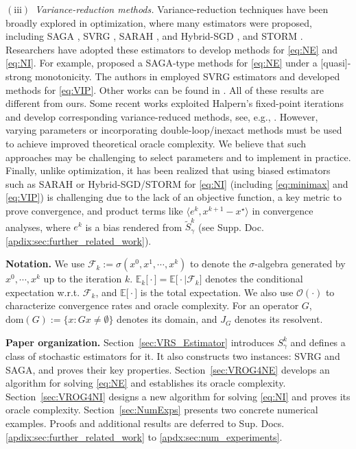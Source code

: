 \documentclass{article}
\newcommand{\sets}[1]{\{#1\}}
\newcommand{\iprods}[1]{\langle #1\rangle}
\newcommand{\dom}[1]{\mathrm{dom}(#1)}
\newcommand{\Expsk}[2]{\mathbb{E}_{#1}\big[#2\big]}
\newcommand{\Expk}[1]{\mathbb{E}\big[#1\big]}
\newcommand{\Fc}{\mathcal{F}}
\newcommand{\BigO}[1]{\mathcal{O}\left(#1\right)}
\theoremstyle{plain}
\theoremstyle{definition}
\theoremstyle{remark}
\begin{document}
\vspace{-0.75ex}
\textit{$\mathrm{(iii)}$~Variance-reduction methods.}	
Variance-reduction techniques have been broadly explored in optimization, where many estimators were proposed, including SAGA \citep{Defazio2014}, SVRG  \citep{SVRG}, SARAH \citep{nguyen2017sarah}, and Hybrid-SGD \citep{Tran-Dinh2019,Tran-Dinh2019a}, and STORM \citep{Cutkosky2019}.
Researchers have adopted these estimators to develop methods for \eqref{eq:NE} and \eqref{eq:NI}. 
For example, \cite{davis2022variance} proposed a SAGA-type methods for \eqref{eq:NE} under a [quasi]-strong monotonicity.
The authors in \cite{alacaoglu2022beyond,alacaoglu2021stochastic} employed SVRG estimators and developed methods for \eqref{eq:VIP}.
Other works can be found in \cite{bot2019forward,carmon2019variance,chavdarova2019reducing,huang2022accelerated,palaniappan2016stochastic,yu2022fast}.
All of these results are different from ours.
Some recent works exploited Halpern's fixed-point iterations and develop corresponding variance-reduced methods, see, e.g., \cite{cai2023variance,cai2022stochastic}.
However, varying parameters or incorporating double-loop/inexact methods must be used to achieve improved theoretical oracle complexity.
We believe that such approaches may be challenging to select parameters and to implement in practice.
Finally, unlike optimization, it has been realized that using biased estimators such as SARAH or Hybrid-SGD/STORM for \eqref{eq:NI} (including \eqref{eq:minimax} and \eqref{eq:VIP}) is challenging due to the lack of an objective function, a key metric to prove convergence, and product terms like $\iprods{e^k, x^{k+1} - x^{\star}}$  in convergence analyses, where $e^k$ is a bias rendered from $\widetilde{S}^k_{\gamma}$ (see Supp. Doc. \ref{apdix:sec:further_related_work}).

\textbf{Notation.}
We use $\Fc_k := \sigma(x^0, x^1, \cdots, x^k)$ to denote the $\sigma$-algebra generated by $x^0,\cdots, x^k$ up to the iteration $k$.
$\Expsk{k}{\cdot} = \Expk{\cdot \mid \Fc_k}$ denotes the conditional expectation w.r.t. $\Fc_k$, and $\Expk{\cdot}$ is the total expectation. 
We also use $\BigO{\cdot}$ to characterize convergence rates and oracle complexity.
For an operator $G$, $\dom{G} := \sets{x : Gx\neq\emptyset}$ denotes its domain, and $J_G$ denotes its resolvent. 

\textbf{Paper organization.}
Section~\ref{sec:VRS_Estimator} introduces  $S^k_{\gamma}$ and defines a class of stochastic estimators for it.
It also constructs two instances: SVRG and SAGA, and proves their key properties.
Section~\ref{sec:VROG4NE} develops an algorithm for solving \eqref{eq:NE} and establishes its oracle complexity.
Section~\ref{sec:VROG4NI} designs a new algorithm for solving \eqref{eq:NI} and proves its oracle complexity.
Section~\ref{sec:NumExps} presents two concrete numerical examples.
Proofs and additional results are deferred to Sup. Docs. \ref{apdix:sec:further_related_work} to \ref{apdx:sec:num_experiments}.
\end{document}
